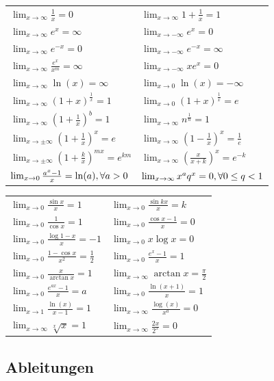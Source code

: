 \documentclass[8pt]{extarticle}
\def\limxo{\lim_{x\to 0}}
\def\limxi{\lim_{x\to\infty}}
\def\limxn{\lim_{x\to-\infty}}
\begin{document}
\begin{multicols*}{3}
\begin{center}
\begin{tabularx}{\linewidth}{XX}
    $\limxi \frac{1}{x} = 0$ & $\limxi 1 + \frac{1}{x} = 1$ \\
    $\limxi e^x = \infty$ & $\limxn e^x = 0$ \\
    $\limxi e^{-x} = 0$ & $\limxn e^{-x} = \infty$ \\
    $\limxi \frac{e^x}{x^m} = \infty$ & $\limxn xe^x = 0$ \\
    $\limxi \ln(x) = \infty$ & $\limxo \ln(x) = -\infty$ \\
    $\limxi (1+x)^{\frac{1}{x}} = 1$ & $\limxo (1+x)^{\frac{1}{x}} = e$ \\
    $\limxi (1+\frac{1}{x})^b = 1$ & $\limxi n^{\frac{1}{n}} = 1$ \\
    $\lim_{x\to\pm\infty} (1 + \frac{1}{x})^x = e$ & $\limxi (1-\frac{1}{x})^x = \frac{1}{e}$ \\
    $\lim_{x\to\pm\infty} (1 + \frac{k}{x})^{mx} = e^{km}$ & $\limxi (\frac{x}{x+k})^x = e^{-k}$ \\
    $\limxo \frac{a^x -1}{x} = \ln(a), \newline \forall a > 0$ &
    $\limxi x^a q^x = 0, \newline \forall 0 \le q < 1$ \\
  \end{tabularx}
  \begin{tabularx}{\linewidth}{XX}
    $\limxo \frac{\sin x}{x} = 1$ & $\limxo \frac{\sin kx}{x} = k$\\
    $\limxo \frac{1}{\cos x} = 1$ & $\limxo \frac{\cos x -1}{x} = 0$ \\
    $\limxo \frac{\log 1 - x}{x} = -1$ & $\limxo x \log x = 0$\\
    $\limxo \frac{1 - \cos x}{x^2} = \frac{1}{2}$ & $\limxo \frac{e^x-1}{x} = 1$ \\
    $\limxo \frac{x}{\arctan x} = 1$ & $\limxi \arctan x = \frac{\pi}{2}$ \\
    $\limxo \frac{e^{ax}-1}{x} = a$ & $\limxo \frac{\ln(x+1)}{x} = 1$ \\
    $\lim_{x\to 1} \frac{\ln(x)}{x-1} = 1$ & $\limxi \frac{\log(x)}{x^a} = 0$ \\
    $\limxi \sqrt[x]{x} = 1$ & $\limxi \frac{2x}{2^x} = 0$ \\
  \end{tabularx}
\end{center}



\subsection{Ableitungen}


\end{multicols*}
\end{document}

